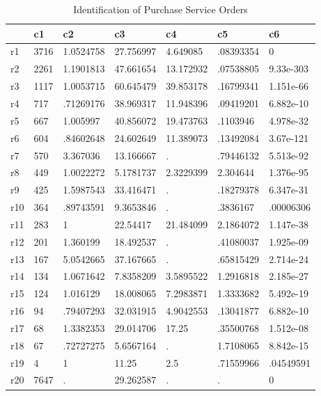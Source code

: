 \begin{table}[htbp]
\caption{\label{clabel} Identification of Purchase Service Orders}\centering\medskip
\begin{tabular}{|l|l|l|l|l|l|l|}\hline  
 & c1  & c2  & c3  & c4  & c5  & c6  \\ \hline  
r1 & 3716 & 1.0524758 & 27.756997 & 4.649085 & .08393354 & 0 \\ \hline 
r2 & 2261 & 1.1901813 & 47.661654 & 13.172932 & .07538805 & 9.33e-303 \\ \hline 
r3 & 1117 & 1.0053715 & 60.645479 & 39.853178 & .16799341 & 1.151e-66 \\ \hline 
r4 & 717 & .71269176 & 38.969317 & 11.948396 & .09419201 & 6.882e-10 \\ \hline 
r5 & 667 & 1.005997 & 40.856072 & 19.473763 & .1103946 & 4.978e-32 \\ \hline 
r6 & 604 & .84602648 & 24.602649 & 11.389073 & .13492084 & 3.67e-121 \\ \hline 
r7 & 570 & 3.367036 & 13.166667 & . & .79446132 & 5.513e-92 \\ \hline 
r8 & 449 & 1.0022272 & 5.1781737 & 2.3229399 & 2.304644 & 1.376e-95 \\ \hline 
r9 & 425 & 1.5987543 & 33.416471 & . & .18279378 & 6.347e-31 \\ \hline 
r10 & 364 & .89743591 & 9.3653846 & . & .3836167 & .00006306 \\ \hline 
r11 & 283 & 1 & 22.54417 & 21.484099 & 2.1864072 & 1.147e-38 \\ \hline 
r12 & 201 & 1.360199 & 18.492537 & . & .41080037 & 1.925e-09 \\ \hline 
r13 & 167 & 5.0542665 & 37.167665 & . & .65815429 & 2.714e-24 \\ \hline 
r14 & 134 & 1.0671642 & 7.8358209 & 3.5895522 & 1.2916818 & 2.185e-27 \\ \hline 
r15 & 124 & 1.016129 & 18.008065 & 7.2983871 & 1.3333682 & 5.492e-19 \\ \hline 
r16 & 94 & .79407293 & 32.031915 & 4.9042553 & .13041877 & 6.882e-10 \\ \hline 
r17 & 68 & 1.3382353 & 29.014706 & 17.25 & .35500768 & 1.512e-08 \\ \hline 
r18 & 67 & .72727275 & 5.6567164 & . & 1.7108065 & 8.842e-15 \\ \hline 
r19 & 4 & 1 & 11.25 & 2.5 & .71559966 & .04549591 \\ \hline 
r20 & 7647 & . & 29.262587 & . & . & 0 \\ \hline 
  \end{tabular}
\end{table}
